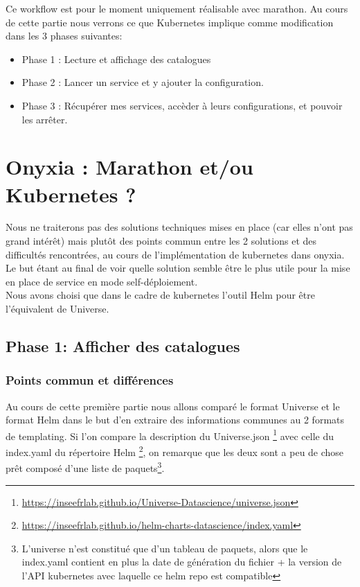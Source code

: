\documentclass[11pt,fleqn]{book} %
\begin{document}
Ce workflow est pour le moment uniquement réalisable avec marathon. Au cours de cette partie nous verrons ce que Kubernetes implique comme modification dans les 3 phases suivantes:
\begin{itemize}
    \item Phase 1 : Lecture et affichage des catalogues
    \item Phase 2 : Lancer un service et y ajouter la configuration.
    \item Phase 3 : Récupérer mes services, accèder à leurs configurations, et pouvoir les arrêter.
\end{itemize}


\section{Onyxia : Marathon et/ou Kubernetes ?}
Nous ne traiterons pas des solutions techniques mises en place (car elles n'ont pas grand intérêt) mais plutôt des points commun entre les 2 solutions et des difficultés rencontrées, au cours de l'implémentation de kubernetes dans onyxia. Le but étant au final de voir quelle solution semble être le plus utile pour la mise en place de service en mode self-déploiement.\\
Nous avons choisi que dans le cadre de kubernetes l'outil Helm pour être l'équivalent de Universe.
\subsection{Phase 1: Afficher des catalogues}
\subsubsection{Points commun et différences}
Au cours de cette première partie nous allons comparé le format Universe et le format Helm dans le but d'en extraire des informations communes au 2 formats de templating. Si l'on compare la description du Universe.json \footnote{\url{https://inseefrlab.github.io/Universe-Datascience/universe.json}} avec celle du index.yaml du répertoire Helm \footnote{\url{https://inseefrlab.github.io/helm-charts-datascience/index.yaml}}, on remarque que les deux sont a peu de chose prêt composé d'une liste de paquets\footnote{L'universe n'est constitué que d'un tableau de paquets, alors que le index.yaml contient en plus la date de génération du fichier + la version de l'API kubernetes avec laquelle ce helm repo est compatible}. \\ 
\end{document}
